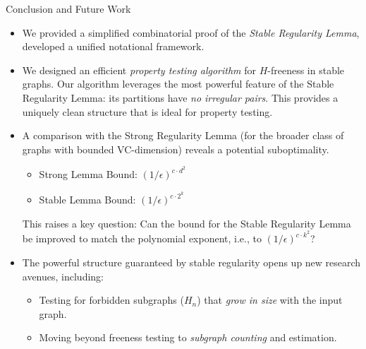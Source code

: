 \documentclass{beamer}
\begin{document}
\begin{frame}{Conclusion and Future Work}
    \footnotesize
    \begin{itemize}
        \item<1-> We provided a simplified combinatorial proof of the \emph{Stable Regularity Lemma},
            developed a unified notational framework.
        \item<2-> We designed an efficient \emph{property testing algorithm} for $H$-freeness in stable graphs.
            Our algorithm leverages the most powerful feature of the Stable Regularity Lemma: its partitions
            have \emph{no irregular pairs}.
            This provides a uniquely clean structure that is ideal for property testing.
        \item<3-> A comparison with the Strong Regularity Lemma (for the broader class of graphs with bounded VC-dimension)
            reveals a potential suboptimality.
            \begin{itemize}
                \item \footnotesize Strong Lemma Bound: $(1/\epsilon)^{c \cdot d^2}$
                \item \footnotesize Stable Lemma Bound: $(1/\epsilon)^{c \cdot 2^k}$
            \end{itemize}
            This raises a key question: Can the bound for the Stable Regularity Lemma be improved to match the polynomial
            exponent, i.e., to $(1/\epsilon)^{c \cdot k^2}$?
        \item<4-> The powerful structure guaranteed by stable regularity opens up new research avenues, including:
            \begin{itemize}
                \item \footnotesize Testing for forbidden subgraphs ($H_n$) that \emph{grow in size} with the input graph.
                \item \footnotesize Moving beyond freeness testing to \emph{subgraph counting} and estimation.
            \end{itemize}
    \end{itemize}
\end{frame}

%
%
\end{document}
